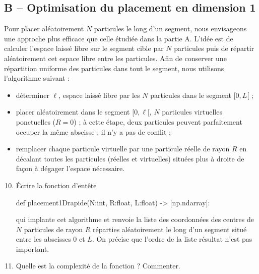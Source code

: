 \documentclass[twoside,french,11pt]{VcCours}
\begin{document}
\subsection*{B -- Optimisation du placement en dimension 1}
Pour placer aléatoirement $N$ particules le long d'un segment, nous envisageons une approche plus efficace que
celle étudiée dans la partie A.
L'idée est de calculer l'espace laissé libre sur le segment cible par $N$ particules puis de répartir aléatoirement cet
espace libre entre les particules. Afin de conserver une répartition uniforme des particules dans tout le segment,
nous utilisons l'algorithme suivant :
\begin{itemize}
  \item[1.] déterminer $\ell$, espace laissé libre par les $N$ particules dans le segment $[0, L[$ ;
  \item[2.] placer aléatoirement dans le segment $[0, \ell[$, $N$ particules virtuelles ponctuelles ($R = 0$) ; à cette étape, deux
particules peuvent parfaitement occuper la même abscisse : il n'y a pas de conflit ;
  \item[3.] remplacer chaque particule virtuelle par une particule réelle de rayon $R$ en décalant toutes les particules
(réelles et virtuelles) situées plus à droite de façon à dégager l'espace nécessaire.
\end{itemize}
\begin{enumerate}\setcounter{enumi}{9}
  \item
Écrire la fonction d'entête
\lstset{xleftmargin=0.7cm,xrightmargin=0.7cm}
\begin{Python*}
def placement1Drapide(N:int, R:float, L:float) -> [np.ndarray]:
\end{Python*}
qui implante cet algorithme et renvoie la liste des coordonnées des centres de $N$ particules de rayon $R$ réparties
aléatoirement le long d'un segment situé entre les abscisses $0$ et $L$. On précise que l'ordre de la liste résultat
n'est pas important.
\item
Quelle est la complexité de la fonction  ? Commenter.
\end{enumerate}
\end{document}
